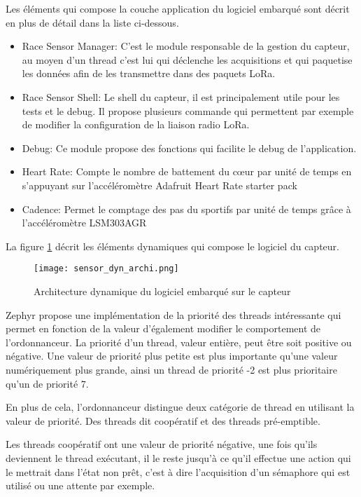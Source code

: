 Les éléments qui compose la couche application du logiciel embarqué sont décrit en plus de détail dans la liste ci-dessous.

\begin{itemize}
\item Race Sensor Manager: C'est le module responsable de la gestion du capteur, au moyen d'un thread c'est lui qui déclenche les acquisitions et qui paquetise les données afin de les transmettre dans des paquets LoRa.
\item Race Sensor Shell: Le shell du capteur, il est principalement utile pour les tests et le debug. Il propose plusieurs commande qui permettent par exemple de modifier la configuration de la liaison radio LoRa.
\item Debug: Ce module propose des fonctions qui facilite le debug de l'application.
\item Heart Rate: Compte le nombre de battement du cœur par unité de temps en s'appuyant sur l'accéléromètre Adafruit Heart Rate starter pack
\item Cadence: Permet le comptage des pas du sportifs par unité de temps grâce à l'accéléromètre LSM303AGR
\end{itemize}

La figure \ref{fig:sensor_dyn_archi} décrit les éléments dynamiques qui compose le logiciel du capteur.

\begin{figure}[htb]
\centering 
\texttt{[image: sensor\_dyn\_archi.png]} 
\caption{Architecture dynamique du logiciel embarqué sur le capteur}
\label{fig:sensor_dyn_archi}
\end{figure}

Zephyr propose une implémentation de la priorité des threads intéressante qui permet en fonction de la valeur d'également modifier le comportement de l'ordonnanceur. La priorité d'un thread, valeur entière, peut être soit positive ou négative. Une valeur de priorité plus petite est plus importante qu'une valeur numériquement plus grande, ainsi un thread de priorité -2 est plus prioritaire qu'un de priorité 7.

En plus de cela, l'ordonnanceur distingue deux catégorie de thread en utilisant la valeur de priorité. Des threads dit coopératif et des threads pré-emptible.

Les threads coopératif ont une valeur de priorité négative, une fois qu'ils deviennent le thread exécutant, il le reste jusqu'à ce qu'il effectue une action qui le mettrait dans l'état non prêt, c'est à dire l'acquisition d'un sémaphore qui est utilisé ou une attente par exemple.

